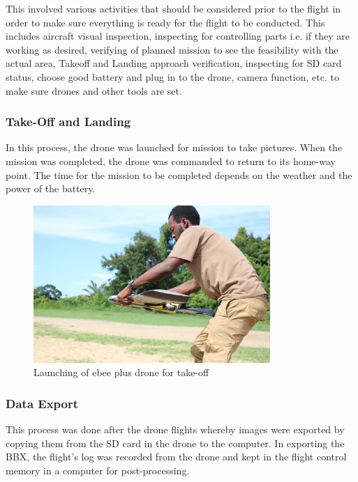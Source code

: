 \documentclass[a4paper,12pt,twoside]{article}
\begin{document}
    This involved various activities that should be considered prior to the flight in order to make sure everything is ready for the flight to be conducted. This includes aircraft visual inspection, inspecting for controlling parts i.e. if they are working as desired, verifying of planned mission to see the feasibility with the actual area, Takeoff and Landing approach verification, inspecting for SD card status, choose good battery and plug in to the drone, camera function, etc. to make sure drones and other tools are set.
    
    \subsubsection{Take-Off and Landing}
    
    In this process, the drone was launched for mission to take pictures. When the mission was completed, the drone was commanded to return to its home-way point. The time for the mission to be completed depends on the weather and the power of the battery.
    
        \begin{figure} %
            \centering
            \includegraphics[width=0.8\textwidth]{images/image6.jpg}
            \caption{Launching of ebee plus drone for take-off}
        \end{figure}
    
    \subsubsection{Data Export}
    This process was done after the drone flights whereby images were exported by copying them from the SD card in the drone to the computer. In exporting the BBX, the flight’s log was recorded from the drone and kept in the flight control memory in a computer for post-processing. 
    
\end{document}
